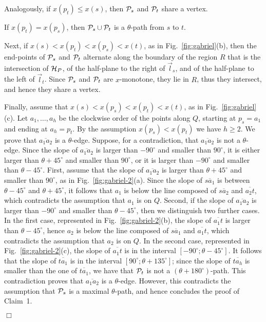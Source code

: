 \documentclass{llncs}
\renewenvironment{proof}
{{\bf Proof:}}{\hspace*{\fill}$\Box$\par\vspace{2mm}}
\begin{document}
\begin{proof}
Analogously, if $x(p_t)\leq x(s)$, then ${\cal P}_s$ and ${\cal P}_t$ share a vertex.

If $x(p_t)= x(p_s)$, then ${\cal P}_s\cup {\cal P}_t$ is a $\theta$-path from $s$ to $t$.

Next, if $x(s)<x(p_t)<x(p_s)<x(t)$, as in Fig.~\ref{fig:gabriel}(b), then the end-points of ${\cal P}_s$ and ${\cal P}_t$ alternate along the boundary of the region $R$ that is the intersection of ${\cal H}_P$, of the half-plane to the right of ${\vec l}_s$, and of the half-plane to the left of ${\vec l}_t$. Since ${\cal P}_s$ and ${\cal P}_t$ are $x$-monotone, they lie in $R$, thus they intersect, and hence they share a vertex.

Finally, assume that $x(s)<x(p_s)< x(p_t)<x(t)$, as in Fig.~\ref{fig:gabriel}(c). Let $a_1, \ldots , a_h$ be the clockwise order of the points along $Q$, starting at $p_s=a_1$ and ending at $a_h=p_t$. By the assumption $x(p_s)< x(p_t)$ we have $h\geq 2$. We prove that $\overline{a_1a_2}$ is a $\theta$-edge. Suppose, for a contradiction, that $\overline{a_1a_2}$ is not a $\theta$-edge. Since the slope of $\overline{a_1a_2}$ is larger than $-90^\circ$ and smaller than $90^\circ$, it is either larger than $\theta+45^\circ$ and smaller than $90^{\circ}$, or it is larger than $-90^\circ$ and smaller than $\theta-45^{\circ}$. First, assume that the slope of $\overline{a_1a_2}$ is larger than $\theta+45^\circ$ and smaller than $90^{\circ}$, as in Fig.~\ref{fig:gabriel-2}(a). Since the slope of $\overline{sa_1}$ is between $\theta-45^\circ$ and $\theta+45^\circ$, it follows that $a_1$ is below the line composed of $\overline{sa_2}$ and $\overline{a_2t}$, which contradicts the assumption that $a_1$ is on $Q$. Second, if the slope of $\overline{a_1a_2}$ is larger than $-90^\circ$ and smaller than $\theta-45^{\circ}$, then we distinguish two further cases. In the first case, represented in Fig.~\ref{fig:gabriel-2}(b), the slope of $\overline{a_1t}$ is larger than $\theta-45^{\circ}$, hence $a_2$ is below the line composed of $\overline{sa_1}$ and $\overline{a_1t}$, which contradicts the assumption that $a_2$ is on $Q$. In the second case, represented in Fig.~\ref{fig:gabriel-2}(c), the slope of $\overline{a_1t}$ is in the interval $[-90^\circ;\theta-45^\circ]$. It follows that the slope of $\overline{ta_1}$ is in the interval $[90^\circ;\theta+135^\circ]$; since the slope of $\overline{ta_h}$ is smaller than the one of $\overline{ta_1}$, we have that ${\cal P}_t$ is not a $(\theta+180^\circ)$-path. This contradiction proves that $\overline{a_1a_2}$ is a $\theta$-edge. However, this contradicts the assumption that ${\cal P}_s$ is a maximal $\theta$-path, and hence concludes the proof of Claim~1.


\end{proof}
\end{document}
